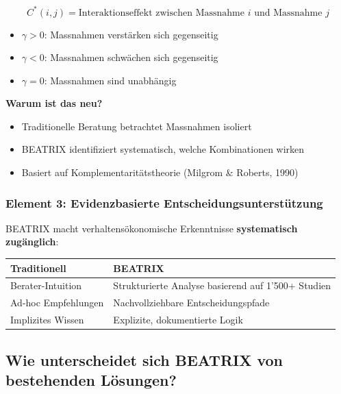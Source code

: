 \documentclass[11pt,a4paper]{article}
\begin{document}
\begin{equation}
C^*(i,j) = \text{Interaktionseffekt zwischen Massnahme } i \text{ und Massnahme } j
\end{equation}

\begin{itemize}
    \item $\gamma > 0$: Massnahmen verstärken sich gegenseitig
    \item $\gamma < 0$: Massnahmen schwächen sich gegenseitig
    \item $\gamma = 0$: Massnahmen sind unabhängig
\end{itemize}

\textbf{Warum ist das neu?}
\begin{itemize}
    \item Traditionelle Beratung betrachtet Massnahmen isoliert
    \item BEATRIX identifiziert systematisch, welche Kombinationen wirken
    \item Basiert auf Komplementaritätstheorie (Milgrom \& Roberts, 1990)
\end{itemize}

\subsubsection{Element 3: Evidenzbasierte Entscheidungsunterstützung}

BEATRIX macht verhaltensökonomische Erkenntnisse \textbf{systematisch zugänglich}:

\begin{table}[h]
\centering
\begin{tabular}{ll}
\toprule
\textbf{Traditionell} & \textbf{BEATRIX} \\
\midrule
Berater-Intuition & Strukturierte Analyse basierend auf 1'500+ Studien \\
Ad-hoc Empfehlungen & Nachvollziehbare Entscheidungspfade \\
Implizites Wissen & Explizite, dokumentierte Logik \\
\bottomrule
\end{tabular}
\end{table}

\subsection{Wie unterscheidet sich BEATRIX von bestehenden Lösungen?}
\end{document}
